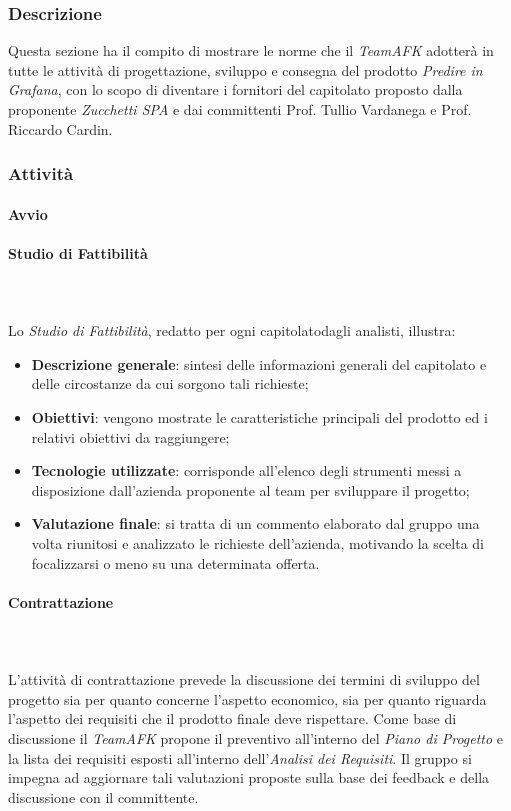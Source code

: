 		\subsubsection{Descrizione}
		Questa sezione ha il compito di mostrare le norme che il \textit{TeamAFK} adotterà in tutte le attività di progettazione, sviluppo e consegna del prodotto \textit{Predire in Grafana}, con lo scopo di diventare i fornitori del capitolato proposto dalla proponente \textit{Zucchetti SPA} e dai committenti Prof. Tullio Vardanega e Prof. Riccardo Cardin.
		\subsubsection{Attività}
			\paragraph{Avvio}
			\paragraph*{Studio di Fattibilità} \mbox{} \\ \mbox{} \\
			Lo \textit{Studio di Fattibilità}, redatto per ogni capitolato\glo dagli analisti, illustra:
			\begin{itemize}
				\item \textbf{Descrizione generale}: sintesi delle informazioni generali del capitolato e delle circostanze da cui sorgono tali richieste;
				\item \textbf{Obiettivi}: vengono mostrate le caratteristiche principali del prodotto ed i relativi obiettivi da raggiungere;
				\item \textbf{Tecnologie utilizzate}: corrisponde all'elenco degli strumenti messi a disposizione dall'azienda proponente al team per sviluppare il progetto;
				\item \textbf{Valutazione finale}: si tratta di un commento elaborato dal gruppo una volta riunitosi e analizzato le  richieste dell'azienda, motivando la scelta di focalizzarsi o meno su una determinata offerta.
			\end{itemize}
			\paragraph{Contrattazione} \mbox{} \\ \mbox{} \\
			L'attività di contrattazione prevede la discussione dei termini di sviluppo del progetto sia per quanto concerne l'aspetto economico, sia per quanto riguarda l'aspetto dei requisiti che il prodotto finale deve rispettare. Come base di discussione il \textit{TeamAFK} propone il preventivo all'interno del \textit{Piano di Progetto} e la lista dei requisiti esposti all'interno dell'\textit{Analisi dei Requisiti}. Il gruppo si impegna ad aggiornare tali
valutazioni proposte sulla base dei feedback e della discussione con il committente.
